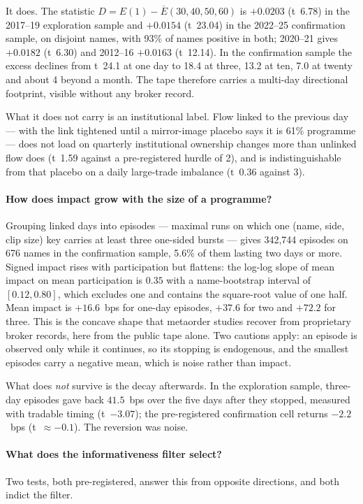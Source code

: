 \documentclass[11pt]{article}
\begin{document}
It does. The statistic $D = E(1) - \overline{E}(30,40,50,60)$ is $+0.0203$ (t~6.78) in the 2017--19 exploration
sample and $+0.0154$ (t~23.04) in the 2022--25 confirmation sample, on disjoint names, with 93\% of names
positive in both; 2020--21 gives $+0.0182$ (t~6.30) and 2012--16 $+0.0163$ (t~12.14). In the confirmation
sample the excess declines from t~24.1 at one day to 18.4 at three, 13.2 at ten, 7.0 at twenty and about 4
beyond a month. The tape therefore carries a multi-day directional footprint, visible without any broker
record.

What it does not carry is an institutional label. Flow linked to the previous day --- with the link tightened
until a mirror-image placebo says it is 61\% programme --- does not load on quarterly institutional ownership
changes more than unlinked flow does (t~1.59 against a pre-registered hurdle of 2), and is indistinguishable
from that placebo on a daily large-trade imbalance (t~0.36 against 3).

\paragraph{How does impact grow with the size of a programme?} Grouping linked days into episodes --- maximal
runs on which one (name, side, clip size) key carries at least three one-sided bursts --- gives 342,744
episodes on 676 names in the confirmation sample, 5.6\% of them lasting two days or more. Signed impact rises
with participation but flattens: the log-log slope of mean impact on mean participation is $0.35$ with a
name-bootstrap interval of $[0.12, 0.80]$, which excludes one and contains the square-root value of one half.
Mean impact is $+16.6$~bps for one-day episodes, $+37.6$ for two and $+72.2$ for three. This is the concave
shape that metaorder studies recover from proprietary broker records, here from the public tape alone. Two
cautions apply: an episode is observed only while it continues, so its stopping is endogenous, and the
smallest episodes carry a negative mean, which is noise rather than impact.

What does \emph{not} survive is the decay afterwards. In the exploration sample, three-day episodes gave back
$41.5$~bps over the five days after they stopped, measured with tradable timing (t~$-3.07$); the pre-registered
confirmation cell returns $-2.2$~bps (t~$\approx -0.1$). The reversion was noise.

\paragraph{What does the informativeness filter select?} Two tests, both pre-registered, answer this from
opposite directions, and both indict the filter.
\end{document}
